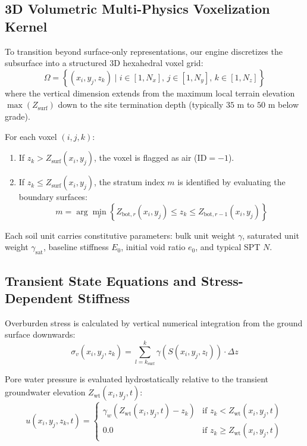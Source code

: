 \documentclass[11pt,a4paper]{article}
\begin{document}
\subsection{3D Volumetric Multi-Physics Voxelization Kernel}

To transition beyond surface-only representations, our engine discretizes the subsurface into a structured 3D hexahedral voxel grid:
\begin{equation}
\Omega = \left\{(x_i, y_j, z_k) \mid i \in [1, N_x], \, j \in [1, N_y], \, k \in [1, N_z]\right\}
\end{equation}
where the vertical dimension extends from the maximum local terrain elevation $\max(Z_{\text{surf}})$ down to the site termination depth (typically $35\text{ m}$ to $50\text{ m}$ below grade). 

For each voxel $(i, j, k)$:
\begin{enumerate}
    \item If $z_k > Z_{\text{surf}}(x_i, y_j)$, the voxel is flagged as air ($\text{ID} = -1$).
    \item If $z_k \le Z_{\text{surf}}(x_i, y_j)$, the stratum index $m$ is identified by evaluating the boundary surfaces:
    \begin{equation}
    m = \arg\min_r \left\{Z_{\text{bot}, r}(x_i, y_j) \le z_k \le Z_{\text{bot}, r-1}(x_i, y_j)\right\}
    \end{equation}
\end{enumerate}

Each soil unit carries constitutive parameters: bulk unit weight $\gamma$, saturated unit weight $\gamma_{\text{sat}}$, baseline stiffness $E_0$, initial void ratio $e_0$, and typical SPT $N$.

\subsection{Transient State Equations and Stress-Dependent Stiffness}

Overburden stress is calculated by vertical numerical integration from the ground surface downwards:
\begin{equation}
\sigma_v(x_i, y_j, z_k) = \sum_{l=k_{\text{surf}}}^k \gamma\left(S(x_i, y_j, z_l)\right) \cdot \Delta z
\end{equation}

Pore water pressure is evaluated hydrostatically relative to the transient groundwater elevation $Z_{\text{wt}}(x_i, y_j, t)$:
\begin{equation}
u(x_i, y_j, z_k, t) = \begin{cases}
\gamma_w \left(Z_{\text{wt}}(x_i, y_j, t) - z_k\right) & \text{if } z_k < Z_{\text{wt}}(x_i, y_j, t) \\
0.0 & \text{if } z_k \ge Z_{\text{wt}}(x_i, y_j, t)
\end{cases}
\end{equation}
\end{document}
